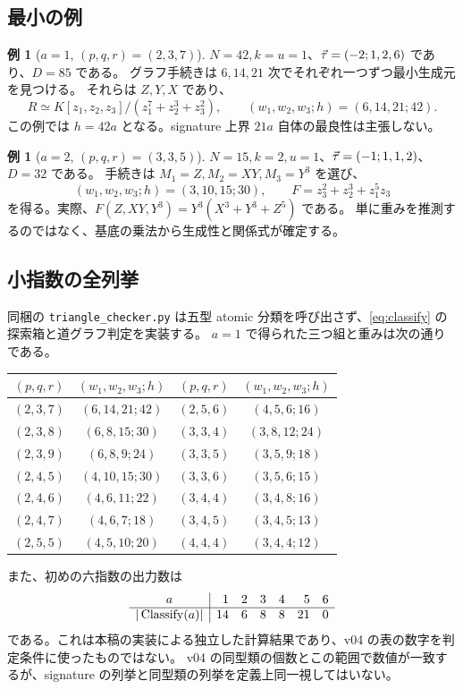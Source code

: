 \documentclass[11pt,a4paper]{ltjsarticle}
\numberwithin{equation}{section}
\theoremstyle{definition}
\newtheorem{example}[theorem]{例}
\begin{document}
\subsection{最小の例}
\begin{example}[$a=1$, $(p,q,r)=(2,3,7)$]
$N=42,k=u=1$、$\vec\tau=(-2;1,2,6)$ であり、$D=85$ である。
グラフ手続きは $6,14,21$ 次でそれぞれ一つずつ最小生成元を見つける。
それらは $Z,Y,X$ であり、
\[
 R\simeq K[z_1,z_2,z_3]/(z_1^7+z_2^3+z_3^2),\qquad
 (w_1,w_2,w_3;h)=(6,14,21;42).
\]
この例では $h=42a$ となる。signature 上界 $21a$ 自体の最良性は主張しない。
\end{example}
\begin{example}[$a=2$, $(p,q,r)=(3,3,5)$]
$N=15,k=2,u=1$、$\vec\tau=(-1;1,1,2)$、$D=32$ である。
手続きは $M_1=Z,M_2=XY,M_3=Y^3$ を選び、
\[
 (w_1,w_2,w_3;h)=(3,10,15;30),\qquad
 F=z_3^2+z_2^3+z_1^5z_3
\]
を得る。実際、$F(Z,XY,Y^3)=Y^3(X^3+Y^3+Z^5)$ である。
単に重みを推測するのではなく、基底の乗法から生成性と関係式が確定する。
\end{example}

\subsection{小指数の全列挙}
同梱の \texttt{triangle\_checker.py} は五型 atomic 分類を呼び出さず、\eqref{eq:classify} の探索箱と道グラフ判定を実装する。
$a=1$ で得られた三つ組と重みは次の通りである。
\begin{center}\small
\begin{tabular}{cc@{\qquad}cc}
\toprule
$(p,q,r)$ & $(w_1,w_2,w_3;h)$ & $(p,q,r)$ & $(w_1,w_2,w_3;h)$\\\midrule
$(2,3,7)$ & $(6,14,21;42)$ & $(2,5,6)$ & $(4,5,6;16)$\\
$(2,3,8)$ & $(6,8,15;30)$ & $(3,3,4)$ & $(3,8,12;24)$\\
$(2,3,9)$ & $(6,8,9;24)$ & $(3,3,5)$ & $(3,5,9;18)$\\
$(2,4,5)$ & $(4,10,15;30)$ & $(3,3,6)$ & $(3,5,6;15)$\\
$(2,4,6)$ & $(4,6,11;22)$ & $(3,4,4)$ & $(3,4,8;16)$\\
$(2,4,7)$ & $(4,6,7;18)$ & $(3,4,5)$ & $(3,4,5;13)$\\
$(2,5,5)$ & $(4,5,10;20)$ & $(4,4,4)$ & $(3,4,4;12)$\\\bottomrule
\end{tabular}
\end{center}
また、初めの六指数の出力数は
\[
\begin{array}{c|rrrrrr}
 a&1&2&3&4&5&6\\\hline
 |\operatorname{Classify}(a)|&14&6&8&8&21&0
\end{array}
\]
である。これは本稿の実装による独立した計算結果であり、v04 の表の数字を判定条件に使ったものではない。
v04 の同型類の個数とこの範囲で数値が一致するが、signature の列挙と同型類の列挙を定義上同一視してはいない。
\end{document}
